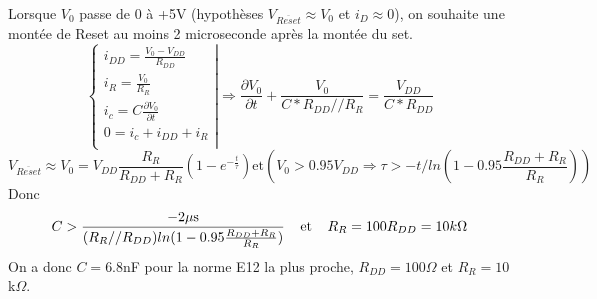 \documentclass{article}
\begin{document}
Lorsque $V_0$ passe de 0 à +5V (hypothèses $V_{\overline{Reset}} \approx V_0$ et $i_D \approx 0$), on souhaite une montée de Reset au moins 2 microseconde après la montée du set.
\[\left\{
  \begin{array}{rcl}
    i_{DD} = \frac{V_0 - V_{DD}}{R_{DD}}\\[1em]
    i_{R} = \frac{V_0}{R_{R}}\\[1em]
    i_c = C\frac{\partial V_0}{\partial t}\\[1em]
    0 = i_c + i_{DD} + i_R\\
  \end{array}
\right|
\Rightarrow \frac{\partial V_0}{\partial t} + \frac{V_0}{C*R_{DD}//R_R} = \frac{V_{DD}}{C*R_{DD}}
\]
\[
  V_{\overline{Reset}} \approx V_0 = V_{DD}\frac{R_R}{R_{DD}+R_R}(1 - e^{-\frac{t}{\tau}} ) \text{et} (V_0 > 0.95V_{DD} \Rightarrow \tau > -t/ln(1-0.95\frac{R_{DD}+R_R}{R_R}) )
\]
Donc
\[
  C > \frac{-2\mu \text{s}}{(R_R//R_{DD})ln(1-0.95\frac{R_{DD}+R_R}{R_R})}
  \text{\;\;\;\;et\;\;\;\;}
  R_R = 100R_{DD} = 10k\Omega
\]
On a donc $C = 6.8$nF pour la norme E12 la plus proche, $R_{DD} = 100\Omega$ et $R_R = 10$k$\Omega$.
\end{document}

